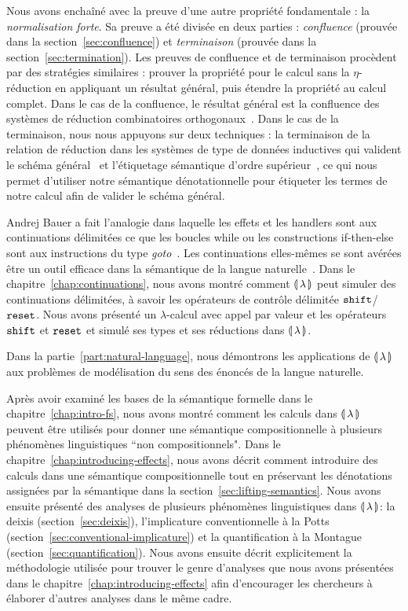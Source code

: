 Nous avons enchaîné avec la preuve d'une autre propriété fondamentale : la
\emph{normalisation forte}. Sa preuve a été divisée en deux parties :
\emph{confluence} (prouvée dans la section~\ref{sec:confluence}) et
\emph{terminaison} (prouvée dans la section~\ref{sec:termination}). Les preuves
de confluence et de terminaison procèdent par des stratégies similaires : prouver
la propriété pour le calcul sans la $\eta$-réduction en appliquant un résultat
général, puis étendre la propriété au calcul complet. Dans le cas de la
confluence, le résultat général est la confluence des systèmes de réduction
combinatoires orthogonaux~\cite{klop1993combinatory}. Dans le cas de la
terminaison, nous nous appuyons sur deux techniques : la terminaison de la
relation de réduction dans les systèmes de type de données inductives qui
valident le schéma général~\cite{blanqui2000termination} et l'étiquetage
sémantique d'ordre supérieur~\cite{hamana2007higher}, ce qui nous permet
d'utiliser notre sémantique dénotationnelle pour étiqueter les termes de notre
calcul afin de valider le schéma général.

Andrej Bauer a fait l'analogie dans laquelle les effets et les handlers sont aux
continuations délimitées ce que les boucles while ou les constructions
if-then-else sont aux instructions du type \textit{goto}~\cite{bauer2012lambda}. Les
continuations elles-mêmes se sont avérées être un outil efficace dans la
sémantique de la langue naturelle~\cite{de2001type,barker2002continuations,shan2005linguistic,de2006towards,
  barker2006continuations,barker2014continuations}. Dans le
chapitre~\ref{chap:continuations}, nous avons montré comment ${\llparenthesis \, \lambda \, \rrparenthesis}$ peut
simuler des continuations délimitées, à savoir les opérateurs de contrôle
délimitée $\mathtt{shift}$/$\mathtt{reset}$. Nous avons présenté un $\lambda$-calcul avec appel
par valeur et les opérateurs $\mathtt{shift}$ et $\mathtt{reset}$ et simulé ses types et ses
réductions dans ${\llparenthesis \, \lambda \, \rrparenthesis}$.

Dans la partie~\ref{part:natural-language}, nous démontrons les applications
de ${\llparenthesis \, \lambda \, \rrparenthesis}$ aux problèmes de modélisation du sens des énoncés de la langue
naturelle.

Après avoir examiné les bases de la sémantique formelle dans le
chapitre~\ref{chap:intro-fs}, nous avons montré comment les calculs dans ${\llparenthesis \, \lambda \, \rrparenthesis}$
peuvent être utilisés pour donner une sémantique compositionnelle à plusieurs
phénomènes linguistiques ``non compositionnels". Dans le
chapitre~\ref{chap:introducing-effects}, nous avons décrit comment introduire
des calculs dans une sémantique compositionnelle tout en préservant les
dénotations assignées par la sémantique dans la
section~\ref{sec:lifting-semantics}. Nous avons ensuite présenté des analyses de
plusieurs phénomènes linguistiques dans ${\llparenthesis \, \lambda \, \rrparenthesis}$: la deixis
(section~\ref{sec:deixis}), l'implicature conventionnelle à la Potts
(section~\ref{sec:conventional-implicature}) et la quantification à la Montague
(section~\ref{sec:quantification}). Nous avons ensuite décrit explicitement la
méthodologie utilisée pour trouver le genre d'analyses que nous avons présentées
dans le chapitre~\ref{chap:introducing-effects} afin d'encourager les chercheurs
à élaborer d'autres analyses dans le même cadre.

